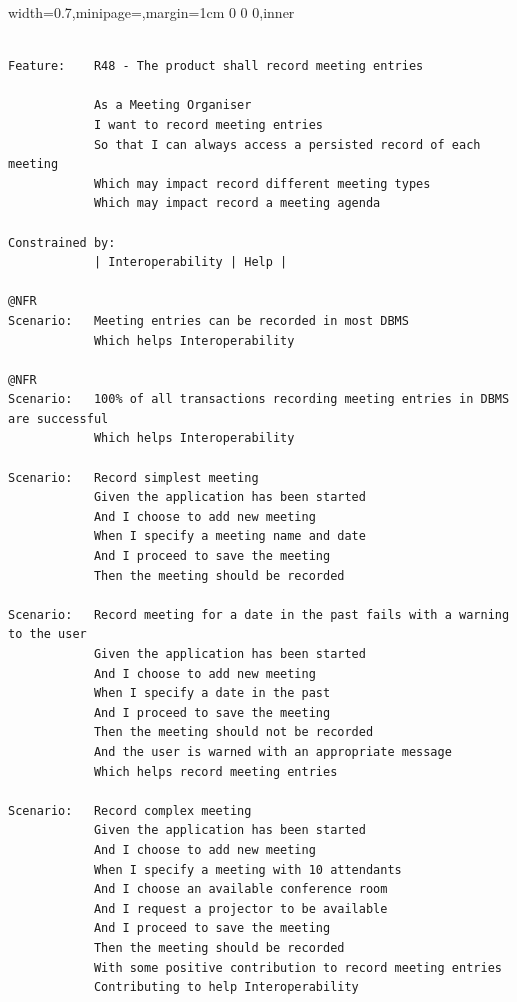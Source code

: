 \documentclass[dissertation,final]{softeng}
\newenvironment{featurecode}[1]
{ \lrbox\featurebox \begin{adjustbox}{width=#1\textwidth,minipage=\textwidth,margin=1cm 0 0 0,inner} }
{ \end{adjustbox}\endlrbox}
\newenvironment{featurelist}[2]
{
\newcommand{\setcaption}{\caption{#1}}
\newcommand{\setlabel}{\label{#2}}
}
{\begin{listing}[h!]\centering\usebox\featurebox\setcaption\setlabel\end{listing}}
\begin{document}
\begin{featurelist}{Changes to Gherkin -- Complete feature}{lst:gherkin_changes_complete}
\begin{featurecode}{0.7}
\begin{verbatim}

Feature:    R48 - The product shall record meeting entries

            As a Meeting Organiser
            I want to record meeting entries
            So that I can always access a persisted record of each meeting
            Which may impact record different meeting types
            Which may impact record a meeting agenda
	
Constrained by:
            | Interoperability | Help |

@NFR
Scenario:   Meeting entries can be recorded in most DBMS
            Which helps Interoperability

@NFR	
Scenario:   100% of all transactions recording meeting entries in DBMS are successful
            Which helps Interoperability
	
Scenario:   Record simplest meeting
            Given the application has been started
            And I choose to add new meeting
            When I specify a meeting name and date
            And I proceed to save the meeting
            Then the meeting should be recorded
	
Scenario:   Record meeting for a date in the past fails with a warning to the user
            Given the application has been started
            And I choose to add new meeting
            When I specify a date in the past
            And I proceed to save the meeting
            Then the meeting should not be recorded
            And the user is warned with an appropriate message
            Which helps record meeting entries

Scenario:   Record complex meeting
            Given the application has been started
            And I choose to add new meeting
            When I specify a meeting with 10 attendants
            And I choose an available conference room
            And I request a projector to be available
            And I proceed to save the meeting
            Then the meeting should be recorded
            With some positive contribution to record meeting entries
            Contributing to help Interoperability
\end{verbatim}
\end{featurecode}
\end{featurelist}
\end{document}
